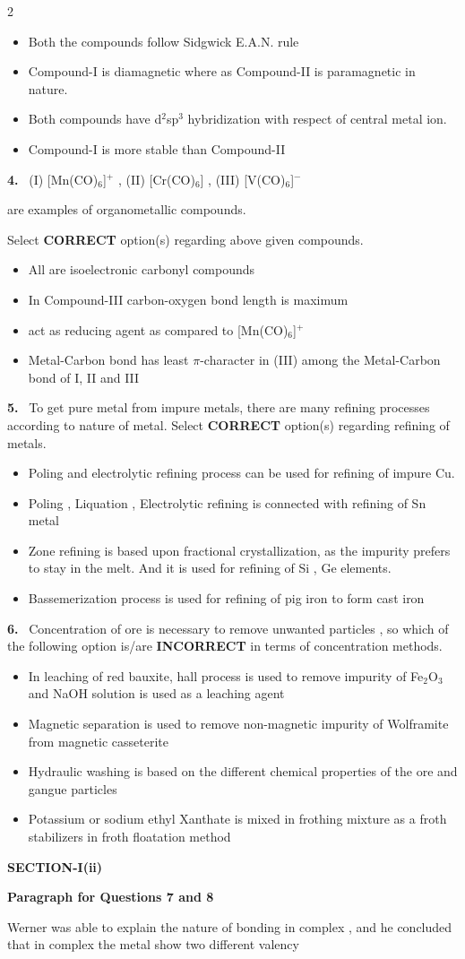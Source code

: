 \documentclass[10pt]{extarticle}
\newcommand{\sect}[1]{\par\smallskip\noindent\textbf{#1}\par}
\newcommand{\qn}[1]{\par\smallskip\noindent\textbf{#1.}~}
\newcommand{\paraq}[2]{\par\smallskip\noindent\textbf{Paragraph for Questions #1 and #2}\par}
\newenvironment{qoptions}{\begin{itemize}[leftmargin=1.8em,itemsep=1pt,topsep=2pt,label={}]}{\end{itemize}}
\newcommand{\opt}[2]{\item[(#1)] #2}
\begin{document}
\begin{multicols}{2}
\begin{qoptions}
\opt{A}{Both the compounds follow Sidgwick E.A.N. rule}
\opt{B}{Compound-I is diamagnetic where as Compound-II is paramagnetic in nature.}
\opt{C}{Both compounds have d$^2$sp$^3$ hybridization with respect of central metal ion.}
\opt{D}{Compound-I is more stable than Compound-II}
\end{qoptions}
\qn{4} (I) [Mn(CO)$_6$]$^+$ , (II) [Cr(CO)$_6$] , (III) [V(CO)$_6$]$^-$\par
are examples of organometallic compounds.\par
Select \textbf{CORRECT} option(s) regarding above given compounds.
\begin{qoptions}
\opt{A}{All are isoelectronic carbonyl compounds}
\opt{B}{In Compound-III carbon-oxygen bond length is maximum}
\opt{C}{[Mn(CO)$_6$] act as reducing agent as compared to [Mn(CO)$_6$]$^+$}
\opt{D}{Metal-Carbon bond has least $\pi$-character in (III) among the Metal-Carbon bond of I, II and III}
\end{qoptions}
\qn{5} To get pure metal from impure metals, there are many refining processes according to nature of metal. Select \textbf{CORRECT} option(s) regarding refining of metals.
\begin{qoptions}
\opt{A}{Poling and electrolytic refining process can be used for refining of impure Cu.}
\opt{B}{Poling , Liquation , Electrolytic refining is connected with refining of Sn metal}
\opt{C}{Zone refining is based upon fractional crystallization, as the impurity prefers to stay in the melt. And it is used for refining of Si , Ge elements.}
\opt{D}{Bassemerization process is used for refining of pig iron to form cast iron}
\end{qoptions}
\qn{6} Concentration of ore is necessary to remove unwanted particles , so which of the following option is/are \textbf{INCORRECT} in terms of concentration methods.
\begin{qoptions}
\opt{A}{In leaching of red bauxite, hall process is used to remove impurity of Fe$_2$O$_3$ and NaOH solution is used as a leaching agent}
\opt{B}{Magnetic separation is used to remove non-magnetic impurity of Wolframite from magnetic casseterite}
\opt{C}{Hydraulic washing is based on the different chemical properties of the ore and gangue particles}
\opt{D}{Potassium or sodium ethyl Xanthate is mixed in frothing mixture as a froth stabilizers in froth floatation method}
\end{qoptions}
\sect{SECTION-I(ii)}
\paraq{7}{8}
Werner was able to explain the nature of bonding in complex , and he concluded that in complex the metal show two different valency\par

\end{multicols}
\end{document}
